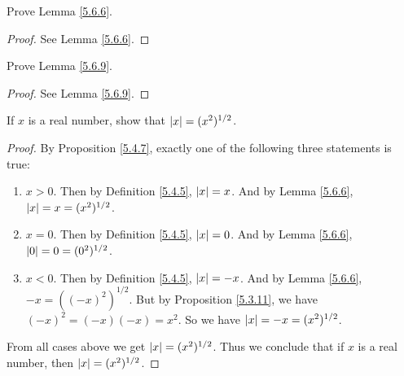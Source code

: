 \begin{exercise}\label{ex 5.6.1}
Prove Lemma \ref{5.6.6}.
\end{exercise}

\begin{proof}
See Lemma \ref{5.6.6}.
\end{proof}

\begin{exercise}\label{ex 5.6.2}
Prove Lemma \ref{5.6.9}.
\end{exercise}

\begin{proof}
See Lemma \ref{5.6.9}.
\end{proof}

\begin{exercise}\label{ex 5.6.3}
If \(x\) is a real number, show that \(\abs*{x} = (x^2)^{1 / 2}\).
\end{exercise}

\begin{proof}
By Proposition \ref{5.4.7}, exactly one of the following three statements is true:
\begin{enumerate}
    \item \(x > 0\).
    Then by Definition \ref{5.4.5}, \(\abs*{x} = x\).
    And by Lemma \ref{5.6.6}, \(\abs*{x} = x = (x^2)^{1 / 2}\).
    \item \(x = 0\).
    Then by Definition \ref{5.4.5}, \(\abs*{x} = 0\).
    And by Lemma \ref{5.6.6}, \(\abs*{0} = 0 = (0^2)^{1 / 2}\).
    \item \(x < 0\).
    Then by Definition \ref{5.4.5}, \(\abs*{x} = -x\).
    And by Lemma \ref{5.6.6}, \(-x = ((-x)^2)^{1 / 2}\).
    But by Proposition \ref{5.3.11}, we have \((-x)^2 = (-x)(-x) = x^2\).
    So we have \(\abs*{x} = -x = (x^2)^{1 / 2}\).
\end{enumerate}
From all cases above we get \(\abs*{x} = (x^2)^{1 / 2}\).
Thus we conclude that if \(x\) is a real number, then \(\abs*{x} = (x^2)^{1 / 2}\).
\end{proof}